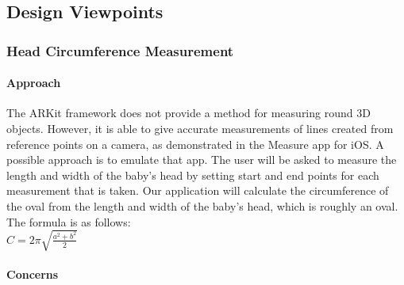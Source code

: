 \documentclass[onecolumn, draftclsnofoot,10pt, compsoc]{IEEEtran}
\begin{document}


\subsection{Design Viewpoints}

\subsubsection{Head Circumference Measurement}

\paragraph{Approach}



The ARKit framework does not provide a method for measuring round 3D objects. However, it is able to give accurate measurements of lines created from reference points on a camera, as demonstrated in the Measure app for iOS. A possible approach is to emulate that app. The user will be asked to measure the length and width of the baby's head by setting start and end points for each measurement that is taken. Our application will calculate the circumference of the oval from the length and width of the baby's head, which is roughly an oval. The formula is as follows:\\

$C = 2\pi\sqrt{\frac{a^2 + b^2}{2}}$\\

\paragraph{Concerns}
\end{document}
